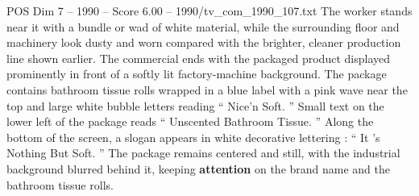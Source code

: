 \begin{textsample}{POS Dim 7 – 1990 – Score 6.00 – 1990/tv\_com\_1990\_107.txt}
The worker stands near it with a bundle or wad of white material, while the surrounding floor and machinery look dusty and worn compared with the brighter, cleaner production line shown earlier.
The commercial ends with the packaged product displayed prominently in front of a softly lit factory-machine background.
The package contains bathroom tissue rolls wrapped in a blue label with a pink wave near the top and large white bubble letters reading “ Nice’n Soft. ” Small text on the lower left of the package reads “ Unscented Bathroom Tissue. ” Along the bottom of the screen, a slogan appears in white decorative lettering : “ It ’s Nothing But Soft. ” The package remains centered and still, with the industrial background blurred behind it, keeping \textbf{attention} on the brand name and the bathroom tissue rolls.

\end{textsample}
